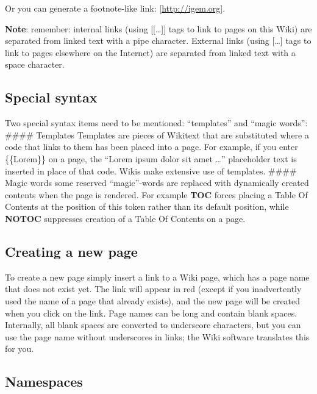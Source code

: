 \documentclass[]{book}
\begin{document}
Or you can generate a footnote-like link: {[}\url{http://igem.org}{]}.

\textbf{Note}: remember: internal links (using {[}{[}\ldots{}{]}{]} tags
to link to pages on this Wiki) are separated from linked text with a
pipe character. External links (using {[}\ldots{}{]} tags to link to
pages elsewhere on the Internet) are separated from linked text with a
space character.

\subsection{Special syntax}\label{special-syntax}

Two special syntax items need to be mentioned: ``templates'' and ``magic
words'': \#\#\#\# Templates Templates are pieces of Wikitext that are
substituted where a code that links to them has been placed into a page.
For example, if you enter \{\{Lorem\}\} on a page, the ``Lorem ipsum
dolor sit amet \ldots{}'' placeholder text is inserted in place of that
code. Wikis make extensive use of templates. \#\#\#\# Magic words some
reserved ``magic''-words are replaced with dynamically created contents
when the page is rendered. For example \textbf{TOC} forces placing a
Table Of Contents at the position of this token rather than its default
position, while \textbf{NOTOC} suppresses creation of a Table Of
Contents on a page.

\subsection{Creating a new page}\label{creating-a-new-page}

To create a new page simply insert a link to a Wiki page, which has a
page name that does not exist yet. The link will appear in red (except
if you inadvertently used the name of a page that already exists), and
the new page will be created when you click on the link. Page names can
be long and contain blank spaces. Internally, all blank spaces are
converted to underscore characters, but you can use the page name
without underscores in links; the Wiki software translates this for you.

\subsection{Namespaces}\label{namespaces}
\end{document}
